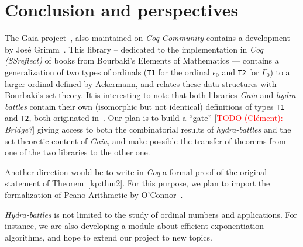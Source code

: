 \documentclass{easychair}
\newcommand{\TODO}[2][]{[\textcolor{red}{TODO (#1):} \emph{#2}]}
\begin{document}
\section{Conclusion and perspectives}






The Gaia project~\cite{Gaia}, also maintained on \textit{Coq-Community} contains a development by José Grimm~\cite{grimm:hal-00911710}. This library -- dedicated  to the implementation in \textit{Coq (SSreflect)} of books from  Bourbaki's Elements of Mathematics --- contains a generalization of two types of ordinals (\texttt{T1} for the ordinal $\epsilon_0$ and
\texttt{T2} for $\Gamma_0$) to a larger ordinal defined by Ackermann, and relates these data structures with Bourbaki's set theory.
It is interesting to note that both libraries \textit{Gaia} and \textit{hydra-battles} contain their own (isomorphic but not identical) definitions of types \texttt{T1} and \texttt{T2}, both originated in~\cite{CantorContrib}.
Our plan is to build a  ``gate'' \TODO[Clément]{Bridge?} giving access to both the combinatorial results of \textit{hydra-battles} and the set-theoretic content of \textit{Gaia}, and make possible the transfer of theorems from one of the two libraries to the other one.

Another direction would be to write in \textit{Coq} a formal proof of the original statement of Theorem~\ref{kp:thm2}. For this purpose, we plan to import  the formalization of Peano Arithmetic by O'Connor~\cite{Goedel}.

 \emph{Hydra-battles} is not limited to the study of ordinal numbers and applications.
 For instance, we are also developing 
a module about efficient exponentiation algorithms, and hope
to extend our project to new topics.




\label{sect:bib}

%
%
%

\end{document}
